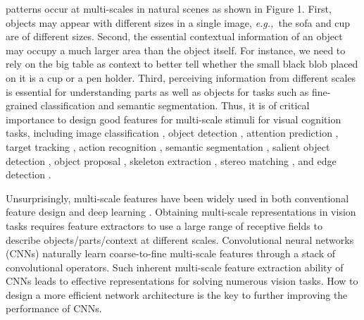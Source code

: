 \documentclass[10pt,journal,cspaper,compsoc]{IEEEtran}
\newcommand{\CheckRmv}[1]{}
\newcommand{\figref}[1]{Figure 1}\newcommand{\tabref}[1]{Table 1}\newcommand{\secref}[1]{Section 1}
\newcommand{\CheckRmv}[1]{#1}
\newcommand{\figref}[1]{Fig.~\ref{#1}}\newcommand{\tabref}[1]{Table~\ref{#1}}\newcommand{\secref}[1]{Sec.~\ref{#1}}
\def\eg{\emph{e.g.,~}}
\begin{document}
 patterns occur at multi-scales in natural scenes
as shown in \figref{fig:receptive_field}.
First, objects may appear with different sizes in a single image,
\eg the sofa and cup are of different sizes.
Second, the essential contextual information of an object may occupy a much
larger area than the object itself.
For instance, we need to rely on the big table as context to better tell
whether the small black blob placed on it is a cup or a pen holder.
Third, perceiving information from different scales is essential for
understanding parts as well as objects for tasks 
such as fine-grained classification and semantic segmentation.
Thus, it is of critical importance to design good features for 
multi-scale stimuli for visual cognition tasks,
including image classification \cite{krizhevsky2012imagenet},
object detection \cite{ren2015faster},
attention prediction \cite{selvaraju2017grad},
target tracking \cite{zhang2017multi},
action recognition \cite{simonyan2014two},
semantic segmentation \cite{chen2018deeplab},
salient object detection \cite{hou2017deeply,BorjiCVM2019},
object proposal \cite{ren2015faster,BingObjCheng2018},
skeleton extraction \cite{zhao2018hifi}, 
stereo matching \cite{nie2019multi},
and edge detection \cite{xie2015holistically,liu2017richer}.




\CheckRmv{
\begin{figure}[t]
  \centering
  \texttt{[image: receptive\_field.pdf]}
  \caption{Multi-scale representations are essential for various vision tasks,
  	such as perceiving boundaries, regions,
  	and semantic categories of the target objects.
  	Even for the simplest recognition tasks,
  	perceiving information from very different scales is essential 
  	to understand parts, objects (\eg sofa, table, and cup in this example),
  	and their surrounding context
  	(\eg `on the table' context contributes to recognizing the black blob).
  }\label{fig:receptive_field}
\end{figure}
}

Unsurprisingly, multi-scale features have been widely used in 
both conventional feature design 
\cite{belongie2002shape,lowe2004distinctive}
and deep learning
\cite{szegedy2015going,chen2017dual}.
Obtaining multi-scale representations in vision tasks
requires feature extractors to use a large range of receptive fields
to describe objects/parts/context at different scales.
Convolutional neural networks (CNNs) naturally learn coarse-to-fine
multi-scale features through a stack of convolutional operators.
Such inherent multi-scale feature extraction ability of CNNs
leads to effective representations for solving numerous vision tasks.
How to design a more efficient network architecture is the key to further
improving the performance of CNNs.
\end{document}
